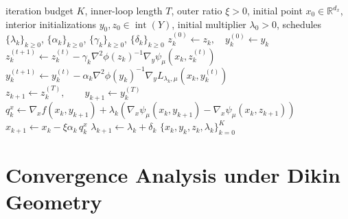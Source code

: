 \documentclass{article}
\begin{document}
\begin{algorithm}[h]
\caption{Barrier-Metric First-Order Algorithm}
\label{alg:dikin_sbo}
\begin{algorithmic}[1]
\Require iteration budget \(K\), inner-loop length \(T\), outer ratio \(\xi>0\),
initial point \(x_0\in\mathbb R^{d_x}\), interior initializations \(y_0,z_0\in\operatorname{int}(Y)\),
initial multiplier \(\lambda_0>0\), schedules \(\{\lambda_k\}_{k\ge 0}\), \(\{\alpha_k\}_{k\ge 0}\), \(\{\gamma_k\}_{k\ge 0}\),
\(\{\delta_k\}_{k\ge 0}\)
    \State \(z_k^{(0)} \gets z_k,\quad y_k^{(0)} \gets y_k\)
        \State \(z_k^{(t+1)} \gets z_k^{(t)} - \gamma_k  \nabla^2\phi(z_k)^{-1} \nabla_y \psi_\mu\!\left(x_k,z_k^{(t)}\right)\)
        \State \(y_k^{(t+1)} \gets y_k^{(t)} - \alpha_k \nabla^2\phi(y_k)^{-1} \nabla_y L_{\lambda_k,\mu}\!\left(x_k,y_k^{(t)}\right)\)
    \EndFor
    \State \(z_{k+1} \gets z_k^{(T)},\qquad y_{k+1} \gets y_k^{(T)}\)
    \State \(q_k^x \gets \nabla_x f(x_k,y_{k+1}) + \lambda_k\!\left(\nabla_x\psi_\mu(x_k,y_{k+1})-\nabla_x\psi_\mu(x_k,z_{k+1})\right)\)
    \State \(x_{k+1} \gets x_k - \xi\alpha_k\, q_k^x\)
    \State \(\lambda_{k+1} \gets \lambda_k + \delta_k\)
\EndFor
\State \Return \(\{x_k,y_k,z_k,\lambda_k\}_{k=0}^{K}\)
\end{algorithmic}
\end{algorithm}





\section{Convergence Analysis under Dikin Geometry}
\label{sec:dikin_geometry}
\end{document}
